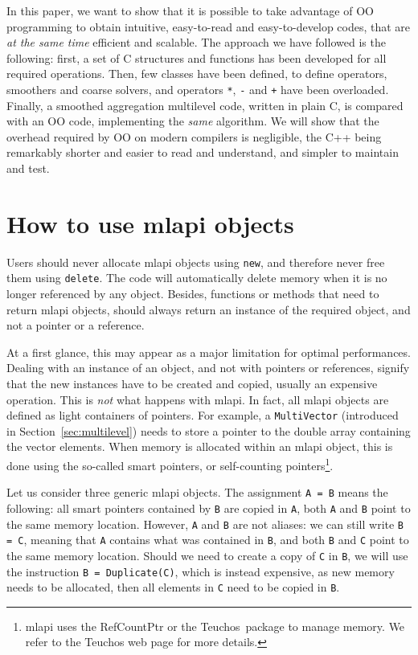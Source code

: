 \documentclass{article}[11pt]
\newcommand{\teuchos}  {{\sc Teuchos}}
\newcommand{\MLAPI}  {{\sc mlapi }}
\newcommand{\MLAPIns}  {{\sc mlapi}}
\begin{document}
In this paper, we want to show
that it is possible to take advantage of OO programming to obtain intuitive,
easy-to-read and easy-to-develop codes, that are {\sl at the same time}
efficient and scalable. The approach we have followed is the following:
first, a set of C structures and functions has been developed for all 
required operations. Then, few classes have been defined, to define
operators, smoothers and coarse solvers, and operators \verb!*!, \verb!-! and
\verb!+! have been overloaded. Finally, a smoothed aggregation multilevel
code, written in plain C, is compared with an OO code, implementing the 
{\sl same} algorithm.  We will show that the overhead
required by OO on modern compilers is negligible, the C++ being remarkably
shorter and easier to read and understand, and simpler to maintain and test.

\section{How to use \MLAPI objects}
\label{sec:usage}

Users should never allocate \MLAPI objects using {\tt new}, and therefore never
free them using {\tt delete}. The code will automatically delete memory
when it is no longer referenced by any object. Besides, functions or methods
that need to return \MLAPI objects, should always return an instance of the
required object, and not a pointer or a reference.

At a first glance, this may appear as a major limitation for optimal
performances. Dealing with an instance of an object, and not with pointers or
references, signify that the new instances have to be created and copied,
usually an expensive operation. This is {\sl not} what happens with \MLAPIns. In
fact, all \MLAPI objects are defined as light containers of pointers. For
example, a {\tt MultiVector} (introduced in Section~\ref{sec:multilevel})
  needs to store a pointer to the double array
containing the vector elements. When memory is allocated within an \MLAPI
object, this is done using the so-called smart pointers, or self-counting
pointers\footnote{\MLAPI uses the RefCountPtr or the \teuchos~package to 
manage memory. We refer to the Teuchos web page for more details.}.

Let us consider three generic \MLAPI objects.
The assignment \verb!A = B! means the following: all smart pointers contained
by \verb!B! are copied in \verb!A!, both \verb!A! and \verb!B! point to the
same memory location. However, \verb!A! and \verb!B! are not aliases: we can
still write \verb!B = C!, meaning that \verb!A! contains what was contained in
\verb!B!, and both \verb!B! and \verb!C! point to the same memory location. 
Should we need to create a copy of \verb!C! in \verb!B!, we will use the
instruction \verb!B = Duplicate(C)!, which is instead expensive, as new memory
needs to be allocated, then all elements in \verb!C! need to be copied in
\verb!B!.
\end{document}
